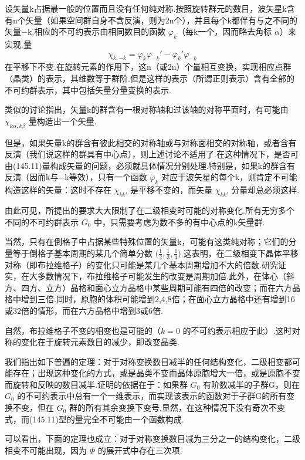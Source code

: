 设矢量k占据最一般的位置而且没有任何纯对称.按照旋转群元的数目，波矢星k含有n个矢量（如果空间群自身不含反演，则为2n个），并且每个k都伴有与之不同的矢量$-$k.相应的不可约表示由相同数目的函数 $\varphi_k$（每k一个，因而略去角标 $\alpha$）来实现.量
\begin{equation}
  \chi_{k,-k}=\varphi_k\varphi_{-k}'-\varphi_k'\varphi_{-k}
\end{equation}
在平移下不变.在旋转元素的作用下，这n（或2n）个量相互变换，实现相应点群（晶类）的表示，其维数等于群阶.但是这样的表示（所谓正则表示）含有全部的不可约群表示，其中包括矢量分量变换的表示.

类似的讨论指出，矢量k的群含有一根对称轴和过该轴的对称平面时，有可能由 $\chi_{k\alpha,k\beta}$ 量构造出一个矢量.

但是，如果矢量k的群含有彼此相交的对称轴或与对称面相交的对称轴，或者含有反演（我们说这样的群具有中心点），则上述讨论不适用了.在这种情况下，是否可由(145.11)量构成矢量的问题，必须就具体情况分别处理.特别是，如果k的群含有反演（因而k与$-$k等效），只有一个函数 $\varphi_k$ 对应于波矢星的每个k，则肯定不可能构造这样的矢量：这时不存在 $\chi_{kk'}$ 是平移不变的，而矢量 $\chi_{kk'}$ 分量却总必须这样.

由此可见，所提出的要求大大限制了在二级相变时可能的对称变化.所有无穷多个不同的不可约群表示 $G_0$ 中，只需要考虑为数不多的有中心点的k矢量群.

当然，只有在倒格子中占据某些特殊位置的矢量k，可能有这类纯对称；它们的分量等于倒格子基本周期的某几个简单分数 $\bigl(\frac{1}{2},\frac{1}{3},\frac{1}{4}\bigr)$.这表明，在二级相变下晶体平移对称（即布拉维格子）的变化只可能是某几个基本周期增加不大的倍数.研究证实，在大多数情况下，布拉维格子可能发生的改变是周期加倍.此外，在体心（斜方、四方、立方）晶格和面心立方晶格中某些周期可能有四倍的改变；而在六方晶格中增到三倍.同时，原胞的体积可能增到2,4,8倍；在面心立方晶格中还有增到16或32倍的情形，而在六方晶格中增到3或6倍.

自然，布拉维格子不变的相变也是可能的（$k=0$ 的不可约表示相应于此）.这时对称的变化在于旋转元素数目的减少，即改变晶类.

我们指出如下普遍的定理：对于对称变换数目减半的任何结构变化，二级相变都可能存在；出现这种变化的方式，或是晶类不变而晶体原胞增大一倍，或是原胞不变而旋转和反映的数目减半.证明的依据在于：如果群 $G_0$ 有阶数减半的子群G，则在 $G_0$ 的不可约表示中总有一个一维表示，而实现该表示的函数对于子群G的所有变换不变，但在 $G_0$ 群的所有其余变换下变号.显然，在这种情况下没有奇次不变式，而(145.11)型的量完全不可能由一个函数构成.

可以看出，下面的定理也成立：对于对称变换数目减为三分之一的结构变化，二级相变不可能出现，因为 $\Phi$ 的展开式中存在三次项.

